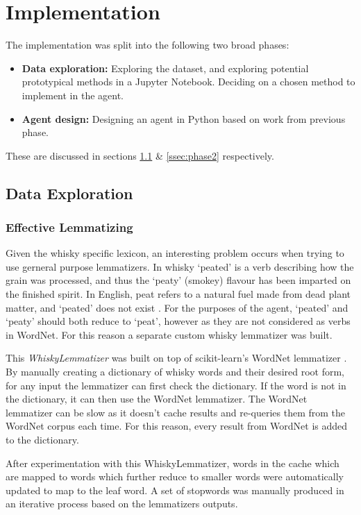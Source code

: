 \section{Implementation}\label{sec:imp}

The implementation was split into the following two broad phases:
\begin{itemize}
    \item \textbf{Data exploration:} Exploring the dataset, and exploring potential prototypical methods in 
    a Jupyter Notebook. Deciding on a chosen method to implement in the agent.
    \item \textbf{Agent design:} Designing an agent in Python based on work from previous phase.
\end{itemize}
These are discussed in sections \ref{ssec:phase1} \& \ref{ssec:phase2} respectively.

\subsection{Data Exploration}\label{ssec:phase1}
\subsubsection{Effective Lemmatizing}\label{words}
Given the whisky specific lexicon, an interesting problem occurs when trying to use gerneral purpose lemmatizers.
In whisky `peated' is a verb describing how the grain was processed, and thus the `peaty' (smokey) flavour has been 
imparted on the finished spirit.  In English, peat refers to a natural fuel made from dead plant matter,
and `peated' does not exist \cite{jenner_2019}. 
For the purposes of the agent, `peated' and `peaty' should both reduce to `peat', however as they are not considered 
as verbs in WordNet.  For this reason a separate custom whisky lemmatizer was built.

This \emph{WhiskyLemmatizer} was built on top of scikit-learn's WordNet lemmatizer \cite{Barupal2011}. By manually
creating a dictionary of whisky words and their desired root form, for any input the lemmatizer can first check the
dictionary. If the word is not in the dictionary, it can then use the WordNet lemmatizer.
The WordNet lemmatizer can be slow as it doesn't cache results and re-queries them from the WordNet corpus
each time.  For this reason, every result from WordNet is added to the dictionary. 

After experimentation with this WhiskyLemmatizer, words in the cache which are mapped to words which further reduce 
to smaller words were automatically updated to map to the leaf word. A set of stopwords was manually produced in an 
iterative process based on the lemmatizers outputs.

